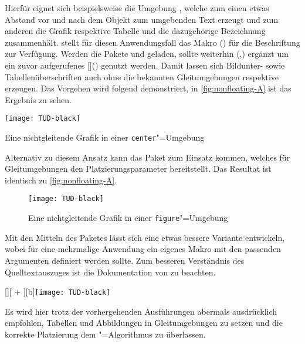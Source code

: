 \documentclass[%
  english,ngerman,%
  cdgeometry=no,DIV=12,%
  cd=false,cdfont=false,cdtitle=true,%
  headings=normal,%
  automark,%
  listof=toc,%
]{tudscrartcl}
\begin{document}
Hierfür eignet sich beispielsweise die Umgebung , welche 
zum einen etwas Abstand vor und nach dem Objekt zum umgebenden Text erzeugt 
und zum anderen die Grafik respektive Tabelle und die dazugehörige Bezeichnung 
zusammenhält. \KOMAScript{} stellt für diesen Anwendungsfall das Makro 
() für die Beschriftung zur Verfügung. 
Werden die Pakete  und  geladen, sollte 
weiterhin (,) ergänzt um 
ein zuvor aufgerufenes  
[]()
genutzt werden. Damit lassen sich Bildunter- sowie Tabellenüberschriften auch 
ohne die bekannten Gleitumgebungen  respektive 
 erzeugen. Das Vorgehen wird folgend demonstriert, in 
\autoref{fig:nonfloating-A} ist das Ergebnis zu sehen.
%
\begin{Hint}
\begin{center}
\captionsetup{type=figure}
\texttt{[image: TUD-black]}
\caption{Eine nichtgleitende Grafik in einer \texttt{center}"=Umgebung}
\label{fig:nonfloating-A}
\end{center}

\end{Hint}
\InputCode\noindent
%
Alternativ zu diesem Ansatz kann das Paket  zum Einsatz kommen, 
welches für Gleitumgebungen den Platzierungsparameter  
bereitstellt. Das Resultat ist identisch zu \autoref{fig:nonfloating-A}.
%
\begin{Hint}
\begin{figure}[H]
\texttt{[image: TUD-black]}
\caption{Eine nichtgleitende Grafik in einer \texttt{figure}"=Umgebung}
\label{fig:nonfloating-B}
\end{figure}

\end{Hint}
%
Mit den Mitteln des Paketes  lässt sich eine etwas bessere 
Variante entwickeln, wobei für eine mehrmalige Anwendung ein eigenes Makro mit 
den passenden Argumenten definiert werden sollte. Zum besseren Verständnis des 
Quelltextauszuges ist die Dokumentation von  zu beachten.
%
\begin{Hint}
[\FBwidth][%
  \dimexpr\FBheight+\abovedisplayskip\relax%
][b]{\texttt{[image: TUD-black]}}{%
  \caption{%
    Eine nichtgleitende Grafik mit \texttt{\textbackslash floatbox}%
  }%
  \label{fig:nonfloating-C}%
}
\end{Hint}
\InputCode\noindent
%
Es wird hier trotz der vorhergehenden Ausführungen abermals ausdrücklich 
empfohlen, Tabellen und Abbildungen in Gleitumgebungen zu setzen und die 
korrekte Platzierung dem "=Algorithmus zu überlassen.
\end{document}
